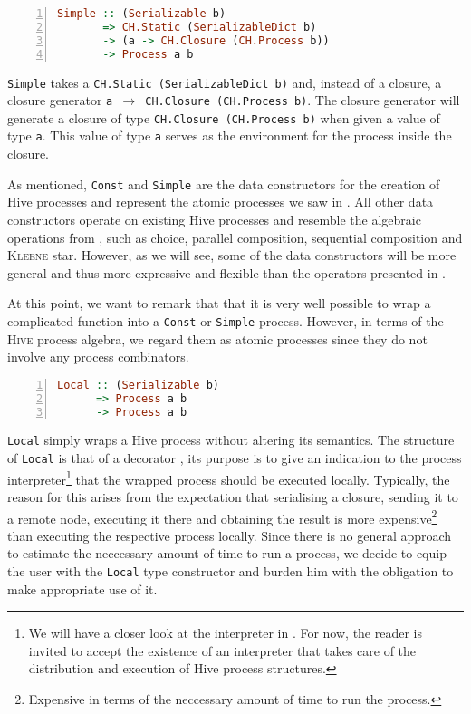\begin{lstlisting}[language=Haskell,caption=Signature of the \texttt{Simple} type constructor.,numbers=left,frame=bt]
Simple :: (Serializable b) 
       => CH.Static (SerializableDict b)
       -> (a -> CH.Closure (CH.Process b))
       -> Process a b
\end{lstlisting}
\texttt{Simple} takes a \texttt{CH.Static (SerializableDict b)} and, instead of a closure, a closure generator \texttt{a $\to$ CH.Closure (CH.Process b)}. The closure generator will generate a closure of type \texttt{CH.Closure (CH.Process b)} when given a value of type \texttt{a}. This value of type \texttt{a} serves as the environment for the process inside the closure.

As mentioned, \texttt{Const} and \texttt{Simple} are the data constructors for the creation of Hive processes and represent the atomic processes we saw in . All other data constructors operate on existing Hive processes and resemble the algebraic operations from , such as choice, parallel composition, sequential composition and \textsc{Kleene} star. However, as we will see, some of the data constructors will be more general and thus more expressive and flexible than the operators presented in .

At this point, we want to remark that that it is very well possible to wrap a complicated function into a \texttt{Const} or \texttt{Simple} process. However, in terms of the \textsc{Hive} process algebra, we regard them as atomic processes since they do not involve any process combinators.

\begin{lstlisting}[language=Haskell,caption=Signature of the \texttt{Local} type constructor.,numbers=left,frame=bt]
Local :: (Serializable b) 
      => Process a b
      -> Process a b
\end{lstlisting}
\texttt{Local} simply wraps a Hive process without altering its semantics. The structure of \texttt{Local} is that of a decorator \cite{Gamma:1995:DPE:186897}, its purpose is to give an indication to the process interpreter\footnote{We will have a closer look at the interpreter in . For now, the reader is invited to accept the existence of an interpreter that takes care of the distribution and execution of Hive process structures.} that the wrapped process should be executed locally. Typically, the reason for this arises from the expectation that serialising a closure, sending it to a remote node, executing it there and obtaining the result is more expensive\footnote{Expensive in terms of the neccessary amount of time to run the process.} than executing the respective process locally. Since there is no general approach to estimate the neccessary amount of time to run a process, we decide to equip the user with the \texttt{Local} type constructor and burden him with the obligation to make appropriate use of it.

